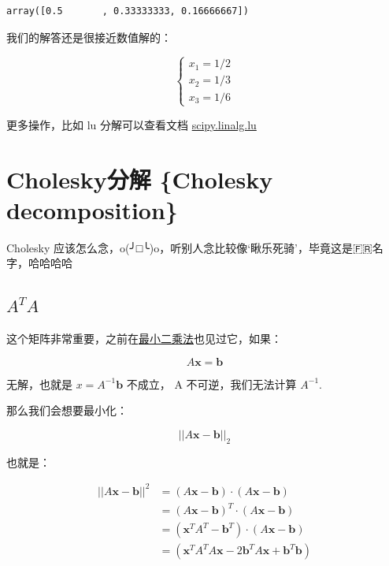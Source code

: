 \documentclass[
]{book}
\begin{document}
\begin{verbatim}
array([0.5       , 0.33333333, 0.16666667])
\end{verbatim}

我们的解答还是很接近数值解的：

\[
\begin{cases}
x_1 = 1/2 \\
x_2 = 1/3\\
x_3 = 1/6
\end{cases}
\]

更多操作，比如 lu 分解可以查看文档 \href{https://docs.scipy.org/doc/scipy-1.4.1/reference/generated/scipy.linalg.lu.html}{scipy.linalg.lu}

\hypertarget{choleskyux5206ux89e3-cholesky-decomposition}{%
\chapter{Cholesky分解 \{Cholesky decomposition\}}\label{choleskyux5206ux89e3-cholesky-decomposition}}

Cholesky 应该怎么念，o(╯□╰)o，听别人念比较像`瞅乐死骑'，毕竟这是🇫🇷名字，哈哈哈哈

\hypertarget{ata}{%
\section{\texorpdfstring{\(A^{T}A\)}{A\^{}\{T\}A}}\label{ata}}

这个矩阵非常重要，之前在\href{https://zhuanlan.zhihu.com/p/89373759}{最小二乘法}也见过它，如果：

\[A\mathbf{x} = \mathbf{b}\]

无解，也就是 \(x= A^{-1}\mathbf{b}\) 不成立， A 不可逆，我们无法计算 \(A^{-1}\).

那么我们会想要最小化：

\[||A\mathbf{x} - \mathbf{b} ||_2\]

也就是：

\begin{align*}
|| A\mathbf{x} - \mathbf{b} ||^2 {}
&= (A\mathbf{x} - \mathbf{b})\cdot(A\mathbf{x} - \mathbf{b}) \\
&= (A\mathbf{x} - \mathbf{b})^T \cdot (A\mathbf{x} - \mathbf{b}) \\
&= (\mathbf{x}^TA^T - \mathbf{b}^T) \cdot (A\mathbf{x} - \mathbf{b})\\
&= (\mathbf{x}^TA^TA\mathbf{x} - 2\mathbf{b}^TA\mathbf{x} + \mathbf{b}^T\mathbf{b}) 
\end{align*}
\end{document}
